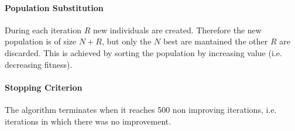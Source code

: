 \paragraph{Population Substitution} During each iteration $R$ new individuals are created. Therefore
the new population is of size $N+R$, but only the $N$ best are mantained the other $R$ are discarded.
This is achieved by sorting the population by increasing value (i.e. decreasing fitness).

\paragraph{Stopping Criterion} The algorithm terminates when it reaches 500 non improving iterations, i.e. 
iterations in which there was no improvement.